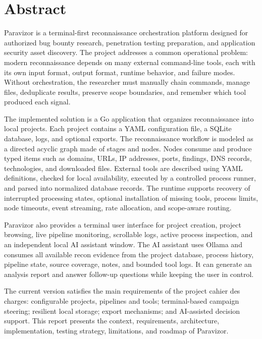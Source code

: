 \documentclass[a4paper,12pt]{article}
\begin{document}
\clearpage
{}
\setcounter{page}{1}

\section*{Abstract}

Paravizor is a terminal-first reconnaissance orchestration platform designed for authorized bug bounty research, penetration testing preparation, and application security asset discovery. The project addresses a common operational problem: modern reconnaissance depends on many external command-line tools, each with its own input format, output format, runtime behavior, and failure modes. Without orchestration, the researcher must manually chain commands, manage files, deduplicate results, preserve scope boundaries, and remember which tool produced each signal.

The implemented solution is a Go application that organizes reconnaissance into local projects. Each project contains a YAML configuration file, a SQLite database, logs, and optional exports. The reconnaissance workflow is modeled as a directed acyclic graph made of stages and nodes. Nodes consume and produce typed items such as domains, URLs, IP addresses, ports, findings, DNS records, technologies, and downloaded files. External tools are described using YAML definitions, checked for local availability, executed by a controlled process runner, and parsed into normalized database records. The runtime supports recovery of interrupted processing states, optional installation of missing tools, process limits, node timeouts, event streaming, rate allocation, and scope-aware routing.

Paravizor also provides a terminal user interface for project creation, project browsing, live pipeline monitoring, scrollable logs, active process inspection, and an independent local AI assistant window. The AI assistant uses Ollama and consumes all available recon evidence from the project database, process history, pipeline state, source coverage, notes, and bounded tool logs. It can generate an analysis report and answer follow-up questions while keeping the user in control.

The current version satisfies the main requirements of the project cahier des charges: configurable projects, pipelines and tools; terminal-based campaign steering; resilient local storage; export mechanisms; and AI-assisted decision support. This report presents the context, requirements, architecture, implementation, testing strategy, limitations, and roadmap of Paravizor.
\end{document}
